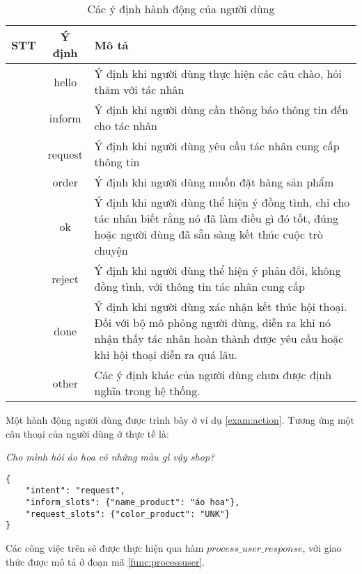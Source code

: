 \begin{table}[!ht]
\caption{Các ý định hành động của người dùng}
\centering
\begin{tabular}{|p{1cm}|c|p{11cm}|}
\hline
\centering\textbf{STT} & 
\centering\textbf{Ý định} & 
\parbox[t]{11cm}{\centering\textbf{Mô tả}} \\ %
\hline
{} & 
hello & 
Ý định khi người dùng thực hiện các câu chào, hỏi thăm với tác nhân \\
\hline
{} & 
inform & 
Ý định khi người dùng cần thông báo thông tin đến cho tác nhân \\
\hline
{} & 
request & 
Ý định khi người dùng yêu cầu tác nhân cung cấp thông tin \\
\hline
{} & 
order & 
Ý định khi người dùng muốn đặt hàng sản phẩm \\
\hline
{} & 
ok & 
Ý định khi người dùng thể hiện ý đồng tình, chỉ cho tác nhân biết rằng nó đã làm điều gì đó tốt, đúng hoặc người dùng đã sẵn sàng kết thúc cuộc trò chuyện \\
\hline
{} & 
reject & 
Ý định khi người dùng thể hiện ý phản đối, không đồng tình, với thông tin tác nhân cung cấp \\
\hline
{} & 
done & 
Ý định khi người dùng xác nhận kết thúc hội thoại. Đối với bộ mô phỏng người dùng, diễn ra khi nó nhận thấy tác nhân hoàn thành được yêu cầu hoặc khi hội thoại diễn ra quá lâu. \\
\hline
{} & 
other & 
Các ý định khác của người dùng chưa được định nghĩa trong hệ thống. \\
\hline
\end{tabular}
\label{tab:userintent}
\end{table}

Một hành động người dùng được trình bày ở ví dụ \ref{exam:action}. Tương ứng một câu thoại của người dùng ở thực tế là:

\textit{Cho mình hỏi áo hoa có những màu gì vậy shop?}

\renewcommand{\lstlistingname}{Ví dụ}
\begin{lstlisting}[caption={Ví dụ cho một hành động},label={exam:action},language=code_vn,firstnumber=1]
{
    "intent": "request",
    "inform_slots": {"name_product": "áo hoa"},
    "request_slots": {"color_product": "UNK"}
}
\end{lstlisting}

Các công việc trên sẽ được thực hiện qua hàm $process\_user\_response$, với giao thức được mô tả ở đoạn mã \ref{func:processuser}.

